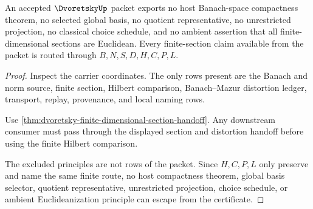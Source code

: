 \begin{theorem}
\label{thm:dvoretsky-nonescape}
An accepted $\DvoretskyUp$ packet exports no host Banach-space compactness theorem, no selected global basis, no quotient representative, no unrestricted projection, no classical choice schedule, and no ambient assertion that all finite-dimensional sections are Euclidean. Every finite-section claim available from the packet is routed through $B,N,S,D,H,C,P,L$.
\end{theorem}
\begin{proof}
Inspect the carrier coordinates. The only rows present are the Banach and norm source, finite section, Hilbert comparison, Banach--Mazur distortion ledger, transport, replay, provenance, and local naming rows.

Use \autoref{thm:dvoretsky-finite-dimensional-section-handoff}. Any downstream consumer must pass through the displayed section and distortion handoff before using the finite Hilbert comparison.

The excluded principles are not rows of the packet. Since $H,C,P,L$ only preserve and name the same finite route, no host compactness theorem, global basis selector, quotient representative, unrestricted projection, choice schedule, or ambient Euclideanization principle can escape from the certificate.
\end{proof}


\begin{closurestatus}{\DvoretskyUp}
  \theoryclosure{\seedClosure}
  \formalstatus{\unformalizedV}
\end{closurestatus}
